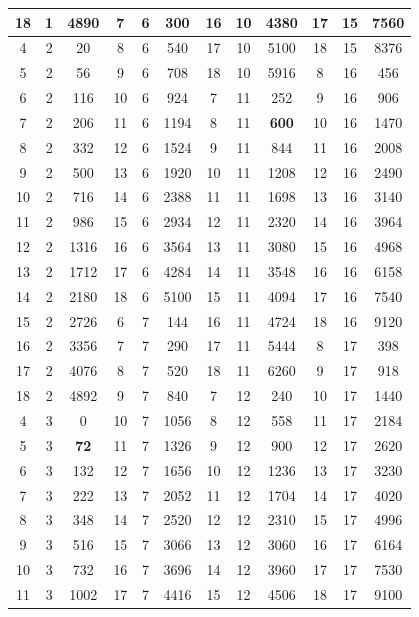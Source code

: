 \documentclass[fin1, tisk]{fmfdelo}
\begin{document}
{\begin{center}
\begin{tabular}{|c|c|c||c|c|c||c|c|c||c|c|c|}
18 & 1 & 4890 & 7 & 6 & 300 & 16 & 10 & 4380 & 17 & 15 & 7560\\ \hline
4 & 2 & 20 & 8 & 6 & 540 & 17 & 10 & 5100 & 18 & 15 & 8376\\ \hline
5 & 2 & 56 & 9 & 6 & 708 & 18 & 10 & 5916 & 8 & 16 & 456\\ \hline
6 & 2 & 116 & 10 & 6 & 924 & 7 & 11 & 252 & 9 & 16 & 906\\ \hline
7 & 2 & 206 & 11 & 6 & 1194 & 8 & 11 & \textbf{600} & 10 & 16 & 1470\\ \hline
8 & 2 & 332 & 12 & 6 & 1524 & 9 & 11 & 844 & 11 & 16 & 2008\\ \hline
9 & 2 & 500 & 13 & 6 & 1920 & 10 & 11 & 1208 & 12 & 16 & 2490\\ \hline
10 & 2 & 716 & 14 & 6 & 2388 & 11 & 11 & 1698 & 13 & 16 & 3140\\ \hline
11 & 2 & 986 & 15 & 6 & 2934 & 12 & 11 & 2320 & 14 & 16 & 3964\\ \hline
12 & 2 & 1316 & 16 & 6 & 3564 & 13 & 11 & 3080 & 15 & 16 & 4968\\ \hline
13 & 2 & 1712 & 17 & 6 & 4284 & 14 & 11 & 3548 & 16 & 16 & 6158\\ \hline
14 & 2 & 2180 & 18 & 6 & 5100 & 15 & 11 & 4094 & 17 & 16 & 7540\\ \hline
15 & 2 & 2726 & 6 & 7 & 144 & 16 & 11 & 4724 & 18 & 16 & 9120\\ \hline
16 & 2 & 3356 & 7 & 7 & 290 & 17 & 11 & 5444 & 8 & 17 & 398\\ \hline
17 & 2 & 4076 & 8 & 7 & 520 & 18 & 11 & 6260 & 9 & 17 & 918\\ \hline
18 & 2 & 4892 & 9 & 7 & 840 & 7 & 12 & 240 & 10 & 17 & 1440\\ \hline
4 & 3 & 0 & 10 & 7 & 1056 & 8 & 12 & 558 & 11 & 17 & 2184\\ \hline
5 & 3 & \textbf{72} & 11 & 7 & 1326 & 9 & 12 & 900 & 12 & 17 & 2620\\ \hline
6 & 3 & 132 & 12 & 7 & 1656 & 10 & 12 & 1236 & 13 & 17 & 3230\\ \hline
7 & 3 & 222 & 13 & 7 & 2052 & 11 & 12 & 1704 & 14 & 17 & 4020\\ \hline
8 & 3 & 348 & 14 & 7 & 2520 & 12 & 12 & 2310 & 15 & 17 & 4996\\ \hline
9 & 3 & 516 & 15 & 7 & 3066 & 13 & 12 & 3060 & 16 & 17 & 6164\\ \hline
10 & 3 & 732 & 16 & 7 & 3696 & 14 & 12 & 3960 & 17 & 17 & 7530\\ \hline
11 & 3 & 1002 & 17 & 7 & 4416 & 15 & 12 & 4506 & 18 & 17 & 9100\\ \hline

\end{tabular}
\end{center}}
\end{document}
